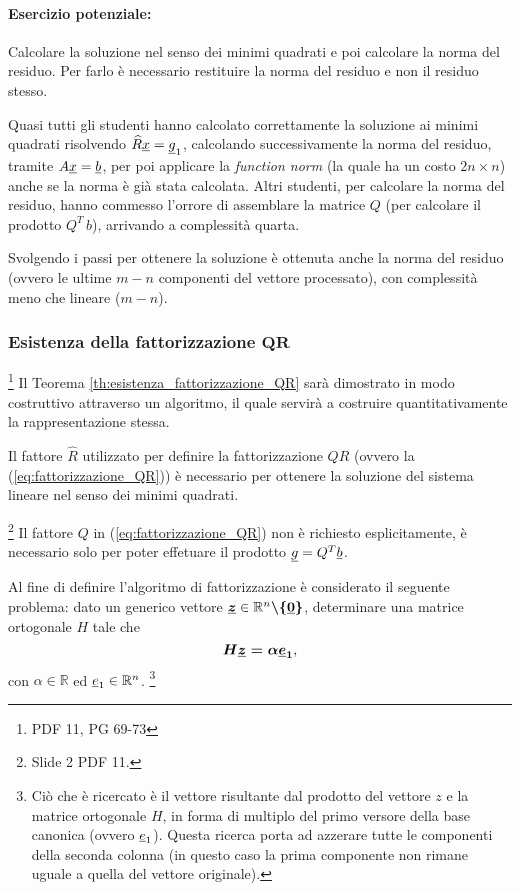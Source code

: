 \paragraph{Esercizio potenziale:}{Calcolare la soluzione nel senso dei minimi quadrati e poi calcolare la norma del residuo. Per farlo è necessario restituire la norma del residuo e non il residuo stesso. 

Quasi tutti gli studenti hanno calcolato correttamente la soluzione ai minimi quadrati risolvendo $\widehat R\uline x=\uline g_1$, calcolando successivamente la norma del residuo, tramite $A\uline x=\uline b$, per poi applicare la \textit{function norm} (la quale ha un costo $2n\times n$) anche se la norma è già stata calcolata. Altri studenti, per calcolare la norma del residuo, hanno commesso l'orrore di assemblare la matrice $Q$ (per calcolare il prodotto $Q^T\,b$), arrivando a complessità quarta. 

Svolgendo i passi per ottenere la soluzione è ottenuta anche la norma del residuo (ovvero le ultime $m-n$ componenti del vettore processato), con complessità meno che lineare ($m-n$).}

\subsubsection{Esistenza della fattorizzazione \texorpdfstring{$\boldsymbol {QR}$}{QR}}\label{sssec:esistFattQR}
\footnote{PDF 11, PG 69-73}
Il Teorema \ref{th:esistenza_fattorizzazione_QR} sarà dimostrato in modo costruttivo attraverso un algoritmo, il quale servirà a costruire quantitativamente la rappresentazione stessa.

Il fattore $\widehat R$ utilizzato per definire la fattorizzazione $QR$ (ovvero la (\ref{eq:fattorizzazione_QR})) è necessario per ottenere la soluzione del sistema lineare nel senso dei minimi quadrati.

\begin{remark}\footnote{Slide 2 PDF 11.}
    Il fattore $Q$ in (\ref{eq:fattorizzazione_QR}) non è richiesto esplicitamente, è necessario solo per poter effetuare il prodotto $\uline g = Q^T\uline b$.
\end{remark}

Al fine di definire l'algoritmo di fattorizzazione è considerato il seguente problema: dato un generico vettore $\boldsymbol{\uline z}\in\mathbb R^n\boldsymbol{\backslash\{\uline 0\}}$, determinare una matrice ortogonale $H$ tale che
\begin{equation}\label{eq:Hz=ae1}
   \boldsymbol{H\uline z = \alpha\uline e_1},
\end{equation}
con $\alpha\in\mathbb R$ ed $\uline e_1\in\mathbb R^n$. \footnote{Ciò che è ricercato è il vettore risultante dal prodotto del vettore $z$ e la matrice ortogonale $H$, in forma di multiplo del primo versore della base canonica (ovvero $\uline e_1$). Questa ricerca porta ad azzerare tutte le componenti della seconda colonna (in questo caso la prima componente non rimane uguale a quella del vettore originale).}

